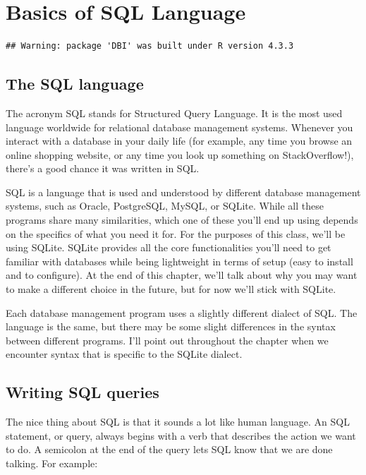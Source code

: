 \documentclass[
]{book}
\begin{document}
\hypertarget{sql}{%
\chapter{Basics of SQL Language}\label{sql}}

\begin{verbatim}
## Warning: package 'DBI' was built under R version 4.3.3
\end{verbatim}

\hypertarget{the-sql-language}{%
\section{The SQL language}\label{the-sql-language}}

The acronym SQL stands for Structured Query Language. It is the most used
language worldwide for relational database management systems. Whenever you
interact with a database in your daily life (for example, any time you browse an
online shopping website, or any time you look up something on StackOverflow!),
there's a good chance it was written in SQL.

SQL is a language that is used and understood by different database management
systems, such as Oracle, PostgreSQL, MySQL, or SQLite. While all these programs
share many similarities, which one of these you'll end up using depends on
the specifics of what you need it for. For the purposes of this class, we'll be
using SQLite. SQLite provides all the core functionalities you'll need to get
familiar with databases while being lightweight in terms of setup (easy to
install and to configure). At the end of this chapter, we'll talk about why you
may want to make a different choice in the future, but for now we'll stick with
SQLite.

Each database management program uses a slightly different dialect of SQL. The
language is the same, but there may be some slight differences in the syntax
between different programs. I'll point out throughout the chapter when we
encounter syntax that is specific to the SQLite dialect.

\hypertarget{writing-sql-queries}{%
\section{Writing SQL queries}\label{writing-sql-queries}}

The nice thing about SQL is that it sounds a lot like human language. An SQL
statement, or query, always begins with a verb that describes the action we want
to do. A semicolon at the end of the query lets SQL know that we are done
talking. For example:
\end{document}
